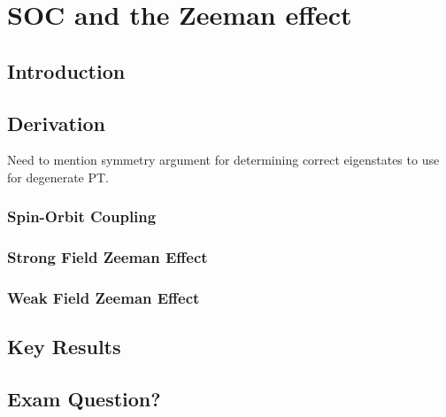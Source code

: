 \chapter{SOC and the Zeeman effect}
\label{chapt4}

\section{Introduction}

\section{Derivation}

Need to mention symmetry argument for determining correct eigenstates to use for degenerate PT.

\subsection{Spin-Orbit Coupling}



\subsection{Strong Field Zeeman Effect}




\subsection{Weak Field Zeeman Effect}




\section{Key Results}





\section{Exam Question?}


